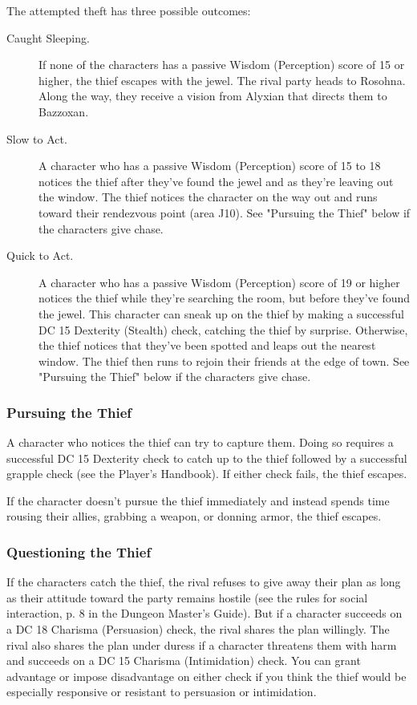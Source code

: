 \documentclass[a4paper, 11pt, bg=full, twocolumn, nooutline]{dndbook}
\begin{document}
The attempted theft has three possible outcomes:

\begin{description}
\item[Caught Sleeping.] If none of the characters has a passive Wisdom (Perception) score of 15 or higher, the thief escapes with the jewel. The rival party heads to Rosohna. Along the way, they receive a vision from Alyxian that directs them to Bazzoxan.
\item[Slow to Act.] A character who has a passive Wisdom (Perception) score of 15 to 18 notices the thief after they've found the jewel and as they're leaving out the window. The thief notices the character on the way out and runs toward their rendezvous point (area J10). See "Pursuing the Thief" below if the characters give chase.
\item[Quick to Act.] A character who has a passive Wisdom (Perception) score of 19 or higher notices the thief while they're searching the room, but before they've found the jewel. This character can sneak up on the thief by making a successful DC 15 Dexterity (Stealth) check, catching the thief by surprise. Otherwise, the thief notices that they've been spotted and leaps out the nearest window. The thief then runs to rejoin their friends at the edge of town. See "Pursuing the Thief" below if the characters give chase.
\end{description}

\subsubsection{Pursuing the Thief}

A character who notices the thief can try to capture them. Doing so requires a successful DC 15 Dexterity check to catch up to the thief followed by a successful grapple check (see the Player's Handbook). If either check fails, the thief escapes.

If the character doesn't pursue the thief immediately and instead spends time rousing their allies, grabbing a weapon, or donning armor, the thief escapes.

\subsubsection{Questioning the Thief}

If the characters catch the thief, the rival refuses to give away their plan as long as their attitude toward the party remains hostile (see the rules for social interaction, p. 8 in the Dungeon Master's Guide). But if a character succeeds on a DC 18 Charisma (Persuasion) check, the rival shares the plan willingly. The rival also shares the plan under duress if a character threatens them with harm and succeeds on a DC 15 Charisma (Intimidation) check. You can grant advantage or impose disadvantage on either check if you think the thief would be especially responsive or resistant to persuasion or intimidation.
\end{document}
